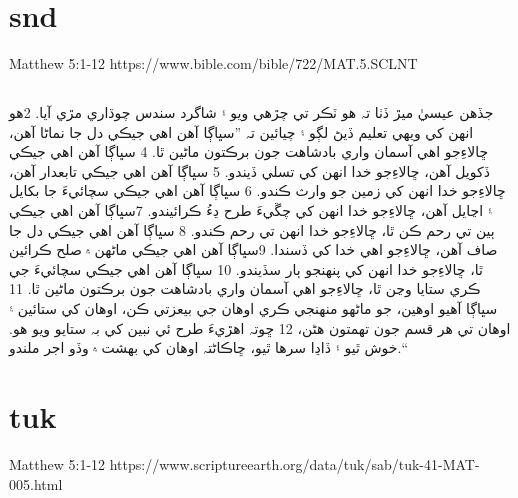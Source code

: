 \documentclass[12pt,fleqn,titlepage,twoside,a4paper]{book}
\begin{document}
\section{snd}

Matthew 5:1-12 https://www.bible.com/bible/722/MAT.5.SCLNT

\begin{arab}[utf]


\section*{}


جڏھن عيسيٰ ميڙ ڏٺا تہ ھو ٽڪر تي چڙھي ويو ۽ شاگرد سندس چوڌاري مڙي آيا. 2ھو انھن کي ويھي تعليم ڏيڻ لڳو ۽ چيائين تہ ”سڀاڳا آھن اھي جيڪي دل جا نماڻا آھن،
ڇالاءِ⁠جو اھي آسمان واري بادشاھت جون برڪتون ماڻين ٿا.
4 سڀاڳا آھن اھي جيڪي ڏکويل آھن،
ڇالاءِ⁠جو خدا انھن کي تسلي ڏيندو.
5 سڀاڳا آھن اھي جيڪي تابعدار آھن،
ڇالاءِ⁠جو خدا انھن کي زمين جو وارث ڪندو.
6 سڀاڳا آھن اھي جيڪي سچائيءَ جا بکايل ۽ اڃايل آھن،
ڇالاءِ⁠جو خدا انھن کي چڱيءَ طرح ڍءُ ڪرائيندو.
7سڀاڳا آھن اھي جيڪي ٻين تي رحم ڪن ٿا،
ڇالاءِ⁠جو خدا انھن تي رحم ڪندو.
8 سڀاڳا آھن اھي جيڪي دل جا صاف آھن،
ڇالاءِ⁠جو اھي خدا کي ڏسندا.
9سڀاڳا آھن اھي جيڪي ماڻھن ۾ صلح ڪرائين ٿا،
ڇالاءِ⁠جو خدا انھن کي پنھنجو ٻار سڏيندو.
10 سڀاڳا آھن اھي جيڪي سچائيءَ جي ڪري ستايا وڃن ٿا،
ڇالاءِ⁠جو اھي آسمان واري بادشاھت جون برڪتون ماڻين ٿا.
11 سڀاڳا آھيو اوھين، جو ماڻھو منھنجي ڪري اوھان جي بي⁠عزتي ڪن، اوھان کي ستائين ۽ اوھان تي ھر قسم جون تھمتون ھڻن، 12 ڇوتہ اھڙيءَ طرح ئي نبين کي بہ ستايو ويو ھو. خوش ٿيو ۽ ڏاڍا سرھا ٿيو، ڇاڪاڻ⁠تہ اوھان کي بھشت ۾ وڏو اجر ملندو.“


\end{arab}

\section{tuk}

Matthew 5:1-12 https://www.scriptureearth.org/data/tuk/sab/tuk-41-MAT-005.html
\end{document}
